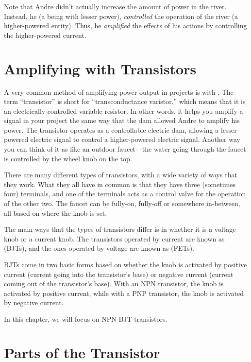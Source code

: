 Note that Andre didn't actually increase the amount of power in the river.
Instead, he (a being with lesser power), \emph{controlled} the operation of the river (a higher-powered entity).
Thus, he \emph{amplified} the effects of his actions by controlling the higher-powered current.

\section{Amplifying with Transistors}

A very common method of amplifying power output in projects is with .
The term ``transistor'' is short for ``transconductance varistor,'' which means that it is an electrically-controlled variable resistor.
In other words, it helps you amplify a signal in your project the same way that the dam allowed Andre to amplify his power.
The transistor operates as a controllable electric dam, allowing a lesser-powered electric signal to control a higher-powered electric signal.
Another way you can think of it as like an outdoor faucet---the water going through the faucet is controlled by the wheel knob on the top.

There are many different types of transistors, with a wide variety of ways that they work.
What they all have in common is that they have three (sometimes four) terminals, and one of the terminals acts as a control valve for the operation of the other two.
The faucet can be fully-on, fully-off or somewhere in-between, all based on where the knob is set.

The main ways that the types of transistors differ is in whether it is a voltage knob or a current knob.
The transistors operated by current are known as  (BJTs), and the ones operated by voltage are known as  (FETs).

BJTs come in two basic forms based on whether the knob is activated by positive current (current going into the transistor's base) or negative current (current coming out of the transistor's base).
With an NPN transistor, the knob is activated by positive current, while with a PNP transistor, the knob is activated by negative current.

In this chapter, we will focus on NPN BJT transistors.

\section{Parts of the Transistor}


